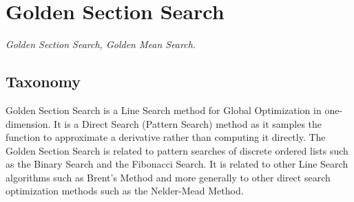 
\section{Golden Section Search} 
\label{sec:golden_section_search}

\emph{Golden Section Search, Golden Mean Search.}

\subsection{Taxonomy}
Golden Section Search is a Line Search method for Global Optimization in one-dimension. It is a Direct Search (Pattern Search) method as it samples the function to approximate a derivative rather than computing it directly.
The Golden Section Search is related to pattern searches of discrete ordered lists such as the Binary Search and the  Fibonacci Search. It is related to other Line Search algorithms such as Brent's Method and more generally to other direct search optimization methods such as the Nelder-Mead Method.

